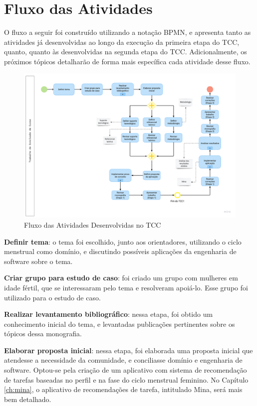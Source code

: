 \section{Fluxo das Atividades}
\label{42}
O fluxo a seguir foi construído utilizando a notação BPMN, e apresenta 
tanto as atividades já desenvolvidas ao longo da execução 
da primeira etapa do TCC, quanto, quanto às desenvolvidas na segunda etapa do TCC. 
Adicionalmente, os próximos tópicos detalharão de 
forma mais específica cada atividade desse fluxo.

\begin{figure}[htbp]
	\caption{Fluxo das Atividades Desenvolvidas no TCC}
	\begin{center}
	\includegraphics[keepaspectratio=true,scale=0.19]{figuras/fluxodeatividades.png}
	\end{center}
    \label{fig03}
\end{figure}

\textbf{Definir tema}: o tema foi escolhido, junto aos orientadores, utilizando o ciclo 
menstrual como domínio, e discutindo
possíveis aplicações da engenharia de software sobre o tema. 

\textbf{Criar grupo para estudo de caso}: foi criado um grupo com mulheres em idade 
fértil, 
que se interessaram pelo tema e resolveram apoiá-lo. Esse grupo foi utilizado 
para o estudo de caso.

\textbf{Realizar levantamento bibliográfico}: nessa etapa, foi obtido um conhecimento 
inicial do tema, e levantadas publicações pertinentes sobre os tópicos dessa monografia. 

\textbf{Elaborar proposta inicial}: nessa etapa, foi elaborada uma proposta inicial que 
atendesse a necessidade da comunidade, e conciliasse domínio e engenharia de software. 
Optou-se pela criação de um aplicativo com sistema de recomendação de tarefas baseadas 
no perfil e
na fase do ciclo menstrual feminino. No Capítulo \ref{ch:mina}, o aplicativo de recomendações de 
tarefa, intitulado Mina, será 
mais bem detalhado.

